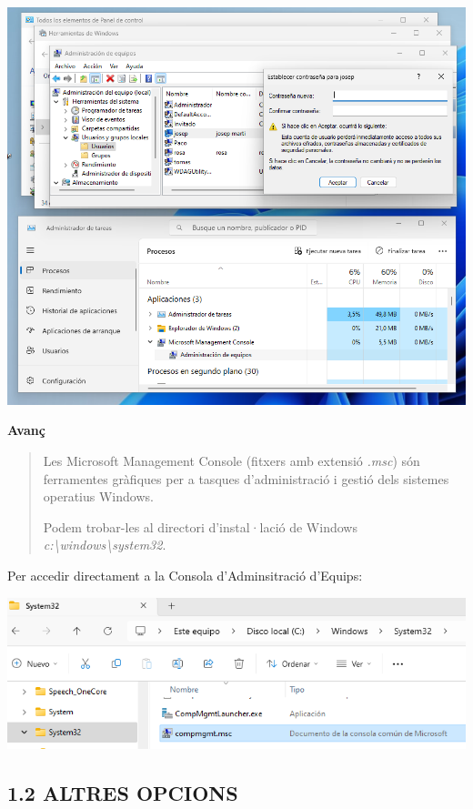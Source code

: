 \documentclass[
  a4paper,
]{article}
\begin{document}
\includegraphics{png/2PaneldeControlHerramientasdeWindowsAdministradordeEquiposUsuariosygruposlocales.png}

\textbf{Avanç}

\begin{quote}
Les Microsoft Management Console (fitxers amb extensió \emph{.msc}) són
ferramentes gràfiques per a tasques d'administració i gestió dels
sistemes operatius Windows.

Podem trobar-les al directori d'instal·lació de Windows
\emph{c:\textbackslash windows\textbackslash system32}.
\end{quote}

Per accedir directament a la Consola d'Adminsitració d'Equips:

\includegraphics{png/fitxerCompmgmt.png}

\subsection{1.2 ALTRES OPCIONS}\label{altres-opcions}
\end{document}
